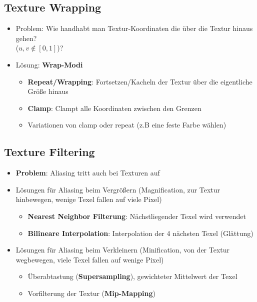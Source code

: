 \documentclass[10pt,a4paper]{article}
\begin{document}
	\subsection{Texture Wrapping}
	\label{tex:sub:texture_wrapping}
	
	\begin{itemize}
		\item Problem: Wie handhabt man Textur-Koordinaten die über die Textur hinaus gehen?\\($u, v \notin [0, 1]$)?
		\item Lösung: \textbf{Wrap-Modi}
		\begin{itemize}
			\item \textbf{Repeat/Wrapping}: Fortsetzen/Kacheln der Textur über die eigentliche Größe hinaus
			\item \textbf{Clamp}: Clampt alle Koordinaten zwischen den Grenzen
			\item Variationen von clamp oder repeat (z.B eine feste Farbe wählen)
		\end{itemize}
	\end{itemize}

	\subsection{Texture Filtering}
	\label{tex:sub:texture_filtering}
	
	\begin{itemize}
		\item \textbf{Problem}: Aliasing tritt auch bei Texturen auf
		\item Lösungen für Aliasing beim Vergrößern (Magnification, zur Textur hinbewegen, wenige Texel fallen auf viele Pixel)
		\begin{itemize}
			\item \textbf{Nearest Neighbor Filterung}: Nächstliegender Texel wird verwendet
			\item \textbf{Bilineare Interpolation}: Interpolation der 4 nächsten Texel (Glättung)
		\end{itemize}
		\item Lösungen für Aliasing beim Verkleinern (Minification, von der Textur wegbewegen, viele Texel fallen auf wenige Pixel)
		\begin{itemize}
			\item Überabtastung (\textbf{Supersampling}), gewichteter Mittelwert der Texel
			\item Vorfilterung der Textur (\textbf{Mip-Mapping})
		\end{itemize}
	\end{itemize}
\end{document}
